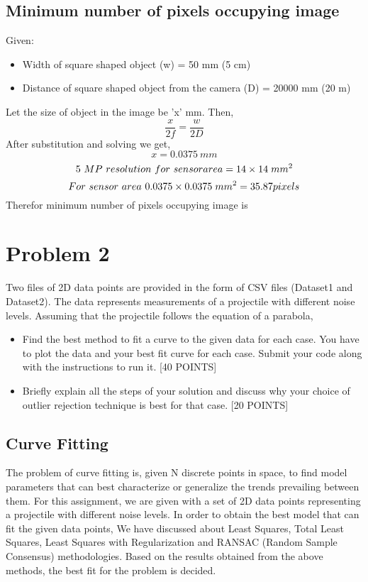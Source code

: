 \documentclass{article}
\begin{document}
\subsection{Minimum number of pixels occupying image}
Given:
\begin{itemize}
    \item Width of square shaped object (w) = 50 mm (5 cm)
    \item Distance of square shaped object from the camera (D) = 20000 mm (20 m)
\end{itemize}
Let the size of object in the image be 'x' mm. Then, 
\begin{equation}
\boxed{\frac{x}{2f}=\frac{w}{2D}}
\end{equation}
After substitution and solving we get,
\begin{equation}
\boxed{x = 0.0375 \ mm}
\end{equation}
\begin{equation}
5 \ MP \ resolution \ for \ sensor area = 14\times14\hspace{.1cm}mm ^2 \\
\end{equation}
\begin{equation}
For \ sensor \ area \ 0.0375\times0.0375\hspace{.1cm}mm ^2 = 35.87 pixels \\
\end{equation}
Therefor minimum number of pixels occupying image is 

\section{Problem 2}
Two files of 2D data points are provided in the form of CSV files (Dataset1 and Dataset2). The data represents measurements of a projectile with different noise levels. Assuming that the projectile follows the equation of a parabola,
\begin{itemize}
    \item Find the best method to fit a curve to the given data for each case. You have to plot the data and your best fit curve for each case. Submit your code along with the instructions to run it. [40 POINTS]
    \item Briefly explain all the steps of your solution and discuss why your choice of outlier rejection technique is best for that case. [20 POINTS]
\end{itemize}
\subsection{Curve Fitting}
The problem of curve fitting is, given N discrete points in space, to find model parameters that can best characterize or generalize the trends prevailing between them. For this assignment, we are given with a set of 2D data points representing a projectile with different noise levels. In order to obtain the best model that can fit the given data points, We have discussed about Least Squares, Total Least Squares, Least Squares with Regularization and RANSAC (Random Sample Consensus) methodologies. Based on the results obtained from the above methods, the best fit for the problem is decided. 
\end{document}
